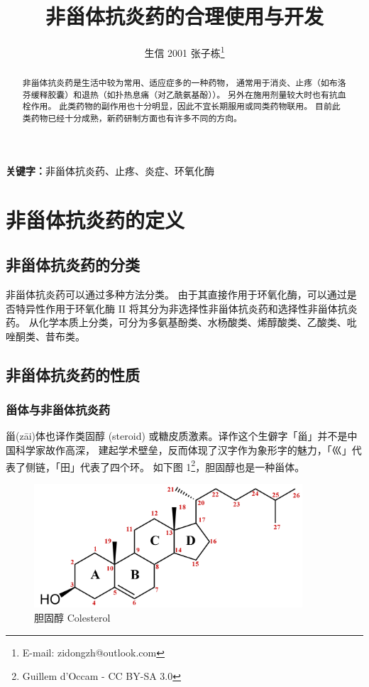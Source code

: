\documentclass[12pt, a4paper, oneside]{ctexart}
\title{非甾体抗炎药的合理使用与开发}
\author{生信 2001 张子栋\thanks{E-mail: zidongzh@outlook.com}}
\date{}
\begin{document}
\maketitle
\thispagestyle{empty}
\newpage

\tableofcontents

\thispagestyle{empty}
\setcounter{page}{0}

\newpage

\begin{abstract}
    非甾体抗炎药是生活中较为常用、适应症多的一种药物，
    通常用于消炎、止疼（如布洛芬缓释胶囊）和退热（如扑热息痛（对乙酰氨基酚））。
    另外在施用剂量较大时也有抗血栓作用。
    此类药物的副作用也十分明显，因此不宜长期服用或同类药物联用。
    目前此类药物已经十分成熟，新药研制方面也有许多不同的方向。
\end{abstract}

\textbf{关键字：}非甾体抗炎药、止疼、炎症、环氧化酶

\newpage
\section{非甾体抗炎药的定义}
\subsection{非甾体抗炎药的分类}
非甾体抗炎药可以通过多种方法分类。
由于其直接作用于环氧化酶，可以通过是否特异性作用于环氧化酶 II 
将其分为非选择性非甾体抗炎药和选择性非甾体抗炎药。
从化学本质上分类，可分为多氨基酚类、水杨酸类、烯醇酸类、乙酸类、吡唑酮类、昔布类。

\subsection{非甾体抗炎药的性质}
\subsubsection{甾体与非甾体抗炎药}
甾(z\=ai)体也译作类固醇 (steroid) 或糖皮质激素。译作这个生僻字「甾」并不是中国科学家故作高深，
建起学术壁垒，反而体现了汉字作为象形字的魅力，「巛」代表了侧链，「田」代表了四个环\cite{ref1}。
如下图 1\footnote{Guillem d'Occam - CC BY-SA 3.0}，胆固醇也是一种甾体。

\begin{figure}[htbp]
    \centering
    \includegraphics[width=10cm,height=4.625cm]{Colesterol.png}
    \caption{胆固醇 Colesterol}
\end{figure} 
\end{document}
